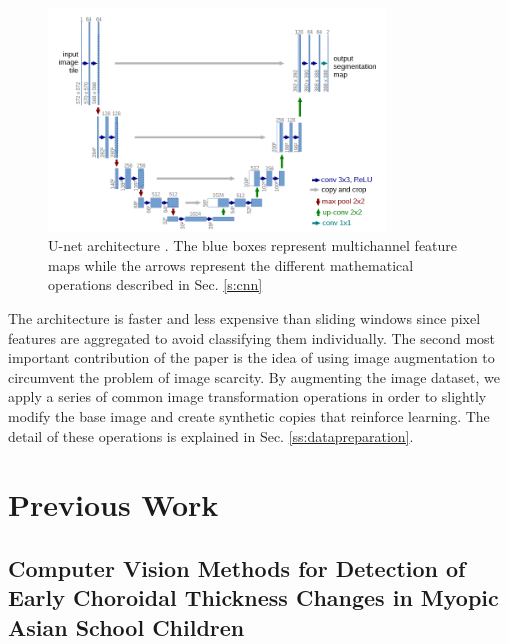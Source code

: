 \documentclass[12pt,a4paper]{scrartcl}
\begin{document}
\begin{figure}[H]
    \centering
    \includegraphics[width=0.8\textwidth]{./images/Unet-architecture.png}
    \caption{U-net architecture \cite{Ronneberger2015}. The blue boxes represent multichannel feature maps while the arrows represent the different mathematical operations described in Sec. \ref{s:cnn}    }
\end{figure}

The architecture is faster and less expensive than sliding windows since pixel features are aggregated to avoid classifying them individually. The second most important contribution of the paper is the idea of using image augmentation to circumvent the problem of image scarcity. By augmenting the image dataset, we apply a series of common image transformation operations in order to slightly modify the base image and create synthetic copies that reinforce learning. The detail of these operations is explained in Sec. \ref{ss:datapreparation}.

\section{Previous Work}\label{s:prevWork}
\subsection{Computer Vision Methods for Detection of Early Choroidal Thickness Changes in Myopic Asian School Children}
\end{document}
